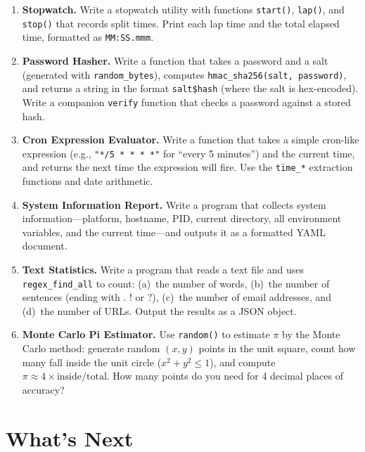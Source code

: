 \begin{enumerate}
    \item \textbf{Stopwatch.} Write a stopwatch utility with functions
    \lstinline|start()|, \lstinline|lap()|, and \lstinline|stop()| that
    records split times. Print each lap time and the total elapsed time,
    formatted as \texttt{MM:SS.mmm}.

    \item \textbf{Password Hasher.} Write a function that takes a password
    and a salt (generated with \lstinline|random_bytes|), computes
    \lstinline|hmac_sha256(salt, password)|, and returns a string in the
    format \texttt{salt\$hash} (where the salt is hex-encoded). Write a
    companion \lstinline|verify| function that checks a password against a
    stored hash.

    \item \textbf{Cron Expression Evaluator.} Write a function that takes a
    simple cron-like expression (e.g., \texttt{"*/5 * * * *"} for ``every 5
    minutes'') and the current time, and returns the next time the
    expression will fire. Use the \lstinline|time_*| extraction functions
    and date arithmetic.

    \item \textbf{System Information Report.} Write a program that collects
    system information---platform, hostname, PID, current directory, all
    environment variables, and the current time---and outputs it as a
    formatted YAML document.

    \item \textbf{Text Statistics.} Write a program that reads a text file
    and uses \lstinline|regex_find_all| to count: (a)~the number of words,
    (b)~the number of sentences (ending with . ! or ?), (c)~the number of
    email addresses, and (d)~the number of URLs. Output the results as a
    JSON object.

    \item \textbf{Monte Carlo Pi Estimator.} Use \lstinline|random()| to
    estimate $\pi$ by the Monte Carlo method: generate random $(x, y)$
    points in the unit square, count how many fall inside the unit circle
    ($x^2 + y^2 \leq 1$), and compute $\pi \approx 4 \times
    \text{inside} / \text{total}$. How many points do you need for 4
    decimal places of accuracy?
\end{enumerate}

\section*{What's Next}\label{sec:time-crypto-os-next}

